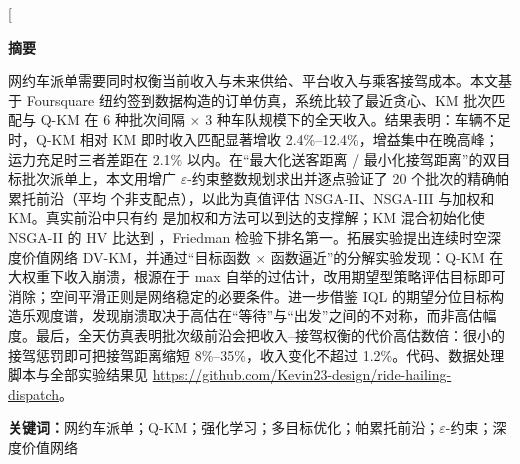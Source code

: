 

\twocolumn[
\maketitle
\begin{minipage}{\textwidth}
	\centering
	{\noindent \textbf{\large 摘要}}
	\vspace{0.5em}
\end{minipage}
\begin{minipage}{1\textwidth}
	\setlength{\parindent}{2em}
	\indent 网约车派单需要同时权衡当前收入与未来供给、平台收入与乘客接驾成本。本文基于 Foursquare 纽约签到数据构造的订单仿真，系统比较了最近贪心、KM 批次匹配与 Q-KM 在 6 种批次间隔 × 3 种车队规模下的全天收入。结果表明：车辆不足时，Q-KM 相对 KM 即时收入匹配显著增收 2.4\%–12.4\%，增益集中在晚高峰；运力充足时三者差距在 2.1\% 以内。在“最大化送客距离 / 最小化接驾距离”的双目标批次派单上，本文用增广 $\varepsilon$-约束整数规划求出并逐点验证了 20 个批次的精确帕累托前沿（平均 \nexact 个非支配点），以此为真值评估 NSGA-II、NSGA-III 与加权和 KM。真实前沿中只有约 \supfrac 是加权和方法可以到达的支撑解；KM 混合初始化使 NSGA-II 的 HV 比达到 \hvinit，Friedman 检验下排名第一。拓展实验提出连续时空深度价值网络 DV-KM，并通过“目标函数 × 函数逼近”的分解实验发现：Q-KM 在大权重下收入崩溃，根源在于 max 自举的过估计，改用期望型策略评估目标即可消除；空间平滑正则是网络稳定的必要条件。进一步借鉴 IQL 的期望分位目标构造乐观度谱，发现崩溃取决于高估在“等待”与“出发”之间的不对称，而非高估幅度。\HINDSIGHTABS 最后，全天仿真表明批次级前沿会把收入–接驾权衡的代价高估数倍：很小的接驾惩罚即可把接驾距离缩短 8\%–35\%，收入变化不超过 1.2\%。代码、数据处理脚本与全部实验结果见 \url{https://github.com/Kevin23-design/ride-hailing-dispatch}。
\end{minipage}
\vspace{0.6em}

{\noindent \textbf{关键词：}网约车派单；Q-KM；强化学习；多目标优化；帕累托前沿；$\varepsilon$-约束；深度价值网络}
\vspace{0.8em}

